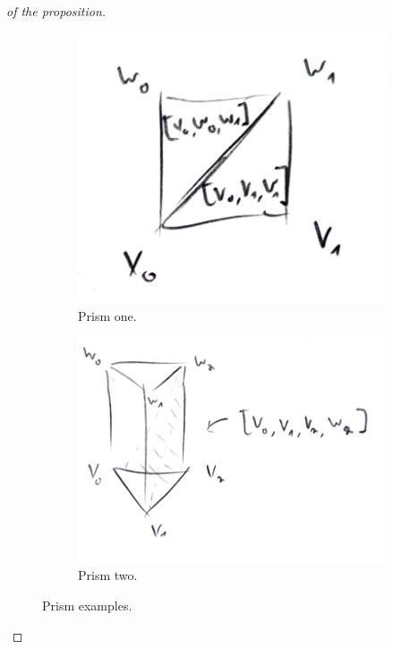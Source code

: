 \documentclass[10pt,a4paper,twoside,openany,hidelinks]{book}
\begin{document}
\begin{proof}[of the proposition]
\begin{figure}[!tbp]
  \begin{subfigure}[b]{0.4\textwidth}
    \includegraphics[width=\textwidth]{sources/prism2}
    \caption{Prism one.}
    \label{fig:f1}
  \end{subfigure}
  \hfill
  \begin{subfigure}[b]{0.4\textwidth}
    \includegraphics[width=\textwidth]{sources/prism3}
    \caption{Prism two.}
    \label{fig:f2}
  \end{subfigure}
  \caption{Prism examples.}
  \label{prism:examples}
\end{figure}


\end{proof}
\end{document}
